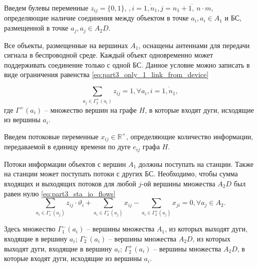 Введем булевы переменные $z_{ij} = \{0, 1\}$, $, i = \overline{1,n_1}, j = \overline{n_1+1, \ n \cdot m}$, определяющие наличие соединения между объектом в точке $a_i, a_i \in A_1$  и БС, размещенной в точке $a_j, a_j \in A_2D$.


Все объекты, размещенные на вершинах $A_1$, оснащены антеннами для передачи сигнала в беспроводной среде. Каждый объект одновременно может поддерживать соединение только с одной БС. Данное условие можно записать в виде ограничения равенства \cref{eq:part3_only_1_link_from_device}


\begin{equation}\label{eq:part3_only_1_link_from_device}
    \sum_{a_j \in \Gamma_2^+(a_i)} z_{ij} = 1, \forall a_i, i =\overline{1, n_1},
\end{equation} 
где $\Gamma^+(a_i)$ -- множество вершин на графе $H$, в которые входят дуги, исходящие из вершины $a_i$.

Введем потоковые переменные $x_{ij} \in \mathbb{R}^+$, определяющие количество информации, передаваемой в единицу времени по дуге $e_{ij}$ графа $H$.

Потоки информации объектов с вершин $A_1$ должны поступать на станции. Также на станции может поступать потоки с других БС. Необходимо, чтобы сумма входящих и выходящих потоков для любой $j$-ой вершины множества $A_2D$ был равен нулю \cref{eq:part3_sta_io_flows} 
\begin{equation}\label{eq:part3_sta_io_flows} 
    \sum_{a_i \in \Gamma_1^-(a_j)} z_{ij} \cdot \vartheta_i + \sum_{a_i \in \Gamma_2^-(a_j)} x_{ij} -  \sum_{a_i \in \Gamma_2^+(a_j)} x_{ji} =0 ,\forall a_j \in A_2. 
\end{equation} 


Здесь множество $\Gamma_1^-(a_i)$ -- вершины множества $A_1$, из которых выходят дуги, входящие в вершину $a_i$; $\Gamma_2^-(a_i)$ -- вершины множества $A_2D$, из которых выходят дуги, входящие в  вершину $a_i$; $\Gamma_2^+(a_i)$ -- вершины множества $A_2D$, в которые входят дуги, исходящие из вершины  $a_i$.

